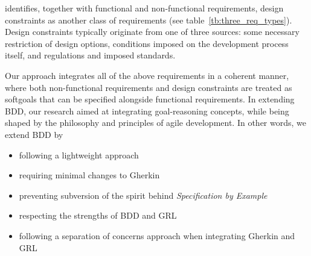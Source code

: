 \documentclass[dissertation,final]{softeng}
\begin{document}
\citet{Leffingwell2011} identifies, together with functional and non-functional requirements, design constraints as another class of requirements (see table~\ref{tb:three_req_types}). Design constraints typically originate from one of three sources: some necessary restriction of design options, conditions imposed on the development process itself, and regulations and imposed standards.

\begin{table}[h!]
\caption[Three types of requirements]{Three types of requirements~\citep{Leffingwell2011}}
\label{tb:three_req_types}
\setlength{\extrarowheight}{1.8pt}
\centering
{}
\end{table}

Our approach integrates all of the above requirements in a coherent manner, where both non-functional requirements and design constraints are treated as softgoals that can be specified alongside functional requirements. In extending BDD, our research aimed at integrating goal-reasoning concepts, while being shaped by the philosophy and principles of agile development. In other words, we extend BDD by 

\begin{itemize}
\item following a lightweight approach
\item requiring minimal changes to Gherkin
\item preventing subversion of the spirit behind \emph{Specification by Example}
\item respecting the strengths of BDD and GRL
\item following a separation of concerns approach when integrating Gherkin and GRL
\end{itemize}
\end{document}
